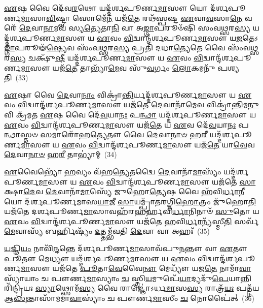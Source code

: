 {\anuvakamend[{\-\ul{𑌚}\-𑌨𑍍𑌦𑍍𑌰\-\ul{𑌮𑌾} 𑌦𑍍𑌵𑍇 𑌦𑍇᳴𑌵\-\ul{𑌲𑍋}\-𑌕\-\ul{𑌮𑍇}\-𑌵 𑌯\-\ul{𑌦𑍍𑌯}\-𑌜𑍍𑌞𑌂 𑌪᳴𑌲𑍍𑌪𑍂𑌲𑌯𑍇\-\ul{𑌯𑍁𑌃} 𑌷𑌟𑍍𑌚᳴}]}%

\-\ul{𑌏}\-𑌷 𑌵𑍈 𑌦𑍇᳴𑌵\-\ul{𑌰}\-𑌥𑍋 𑌯𑌦𑍍𑌦᳴𑌰𑍍\mbox{}𑌶𑌪𑍂𑌰𑍍𑌣\-\ul{𑌮𑌾}\-𑌸𑍗 𑌯𑍋 𑌦᳴𑌰𑍍\mbox{}𑌶𑌪𑍂𑌰𑍍𑌣\-\ul{𑌮𑌾}\-𑌸𑌾\-\ul{𑌵𑌿}\-𑌷𑍍𑌟𑍍𑌵𑌾 𑌸𑍋𑌮𑍇᳴\-\ul{𑌨} 𑌯𑌜᳴\-\ul{𑌤𑍇} 𑌰𑌥᳴𑌸𑍍𑌪𑌷𑍍𑌟 \ul{𑌏}\-𑌵𑌾\-\ul{𑌵}\-𑌸𑌾\-\ul{𑌨𑍇} 𑌵𑌰𑍇᳴ \ul{𑌦𑍇}\-𑌵𑌾\-\ul{𑌨𑌾}\-𑌮𑌵᳴ 𑌸𑍍𑌯\-\ul{𑌤𑍍𑌯𑍇}\-𑌤𑌾\-\ul{𑌨𑌿} 𑌵𑌾 𑌅\-\ul{𑌙𑍍𑌗𑌾}\-𑌪𑌰𑍂𑍞᳴𑌷𑌿 𑌸𑌂𑌵\-\ul{𑌥𑍍𑌸}\-𑌰\-\ul{𑌸𑍍𑌯} 𑌯𑌦𑍍𑌦᳴𑌰𑍍\mbox{}𑌶𑌪𑍂𑌰𑍍𑌣\-\ul{𑌮𑌾}\-𑌸𑍗 𑌯 \ul{𑌏}\-𑌵𑌂 \ul{𑌵𑌿}\-𑌦𑍍𑌵𑌾𑌨𑍍𑌦᳴𑌰𑍍\mbox{}𑌶𑌪𑍂𑌰𑍍𑌣\-\ul{𑌮𑌾}\-𑌸𑍗 𑌯\-\ul{𑌜}\-𑌤𑍇\-𑌽\-\ul{𑌙𑍍𑌗𑌾}\-𑌪𑌰𑍂𑍟᳴\-\ul{𑌷𑍍𑌯𑍇}\-𑌵 𑌸𑌂᳴𑌵\-\ul{𑌥𑍍𑌸}\-𑌰\-\ul{𑌸𑍍𑌯} 𑌪𑍍𑌰𑌤𑌿᳴ 𑌦𑌧𑌾\-\ul{𑌤𑍍𑌯𑍇}\-𑌤𑍇 𑌵𑍈 𑌸𑌂᳴𑌵\-\ul{𑌥𑍍𑌸}\-𑌰\-\ul{𑌸𑍍𑌯} 𑌚𑌕𑍍𑌷𑍁᳴\-\ul{𑌷𑍀} 𑌯𑌦𑍍𑌦᳴𑌰𑍍\mbox{}𑌶𑌪𑍂𑌰𑍍𑌣\-\ul{𑌮𑌾}\-𑌸𑍗 𑌯 \ul{𑌏}\-𑌵𑌂 \ul{𑌵𑌿}\-𑌦𑍍𑌵𑌾𑌨𑍍𑌦᳴𑌰𑍍\mbox{}𑌶𑌪𑍂𑌰𑍍𑌣\-\ul{𑌮𑌾}\-𑌸𑍗 𑌯𑌜᳴\-\ul{𑌤𑍇} 𑌤𑌾𑌭𑍍𑌯𑌾᳴\-\ul{𑌮𑍇}\-𑌵 𑌸𑍁᳴\-\ul{𑌵}\-𑌰𑍍𑌗𑌂 \ul{𑌲𑍋}\-𑌕𑌮𑌨𑍁᳴ 𑌪𑌶𑍍𑌯𑌤𑌿~(33)

\-\ul{𑌏}\-𑌷𑌾 𑌵𑍈 \ul{𑌦𑍇}\-𑌵𑌾\-\ul{𑌨𑌾𑌂} 𑌵𑌿𑌕𑍍𑌰𑌾॑\-\ul{𑌨𑍍𑌤𑌿}\-𑌰𑍍𑌯𑌦𑍍𑌦᳴𑌰𑍍\mbox{}𑌶𑌪𑍂𑌰𑍍𑌣\-\ul{𑌮𑌾}\-𑌸𑍗 𑌯 \ul{𑌏}\-𑌵𑌂 \ul{𑌵𑌿}\-𑌦𑍍𑌵𑌾𑌨𑍍𑌦᳴𑌰𑍍\mbox{}𑌶𑌪𑍂𑌰𑍍𑌣\-\ul{𑌮𑌾}\-𑌸𑍗 𑌯𑌜᳴𑌤𑍇 \ul{𑌦𑍇}\-𑌵𑌾𑌨𑌾᳴\-\ul{𑌮𑍇}\-𑌵 𑌵𑌿𑌕𑍍𑌰𑌾॑\-\ul{𑌨𑍍𑌤𑌿}\-𑌮\-\ul{𑌨𑍁} 𑌵𑌿 𑌕𑍍𑌰᳴𑌮𑌤 \ul{𑌏}\-𑌷 𑌵𑍈 𑌦𑍇᳴\-\ul{𑌵}\-𑌯𑌾\-\ul{𑌨𑌃} 𑌪\-\ul{𑌨𑍍𑌥𑌾} 𑌯𑌦𑍍𑌦᳴𑌰𑍍\mbox{}𑌶𑌪𑍂𑌰𑍍𑌣\-\ul{𑌮𑌾}\-𑌸𑍗 𑌯 \ul{𑌏}\-𑌵𑌂 \ul{𑌵𑌿}\-𑌦𑍍𑌵𑌾𑌨𑍍𑌦᳴𑌰𑍍\mbox{}𑌶𑌪𑍂𑌰𑍍𑌣\-\ul{𑌮𑌾}\-𑌸𑍗 𑌯𑌜᳴\-\ul{𑌤𑍇} 𑌯 \ul{𑌏}\-𑌵 𑌦𑍇᳴\-\ul{𑌵}\-𑌯𑌾\-\ul{𑌨𑌃} 𑌪\-\ul{𑌨𑍍𑌥𑌾}\-𑌸𑍍𑌤𑍞 \ul{𑌸}\-𑌮𑌾𑌰𑍋᳴𑌹\-\ul{𑌤𑍍𑌯𑍇}\-𑌤𑍗 𑌵𑍈 \ul{𑌦𑍇}\-𑌵𑌾\-\ul{𑌨𑌾}\-\-\ul{𑍞} 𑌹\-\ul{𑌰𑍀} 𑌯𑌦𑍍𑌦᳴𑌰𑍍\mbox{}𑌶𑌪𑍂𑌰𑍍𑌣\-\ul{𑌮𑌾}\-𑌸𑍗 𑌯 \ul{𑌏}\-𑌵𑌂 \ul{𑌵𑌿}\-𑌦𑍍𑌵𑌾𑌨𑍍𑌦᳴𑌰𑍍\mbox{}𑌶𑌪𑍂𑌰𑍍𑌣\-\ul{𑌮𑌾}\-𑌸𑍗 𑌯𑌜᳴\-\ul{𑌤𑍇} 𑌯𑌾\-\ul{𑌵𑍇}\-𑌵 \ul{𑌦𑍇}\-𑌵𑌾\-\ul{𑌨𑌾}\-\-\ul{𑍞} 𑌹\-\ul{𑌰𑍀} 𑌤𑌾𑌭𑍍𑌯𑌾॑𑌮𑍍~(34)

\-\ul{𑌏}\-𑌵𑍈𑌭𑍍𑌯𑍋᳴ \ul{𑌹}\-𑌵𑍍𑌯𑌂 𑌵᳴𑌹\-\ul{𑌤𑍍𑌯𑍇}\-𑌤𑌦𑍍𑌵𑍈 \ul{𑌦𑍇}\-𑌵𑌾𑌨𑌾᳴\-\ul{𑌮𑌾}\-𑌸𑍍𑌯𑌂᳴ 𑌯𑌦𑍍𑌦᳴𑌰𑍍\mbox{}𑌶𑌪𑍂𑌰𑍍𑌣\-\ul{𑌮𑌾}\-𑌸𑍗 𑌯 \ul{𑌏}\-𑌵𑌂 \ul{𑌵𑌿}\-𑌦𑍍𑌵𑌾𑌨𑍍𑌦᳴𑌰𑍍\mbox{}𑌶𑌪𑍂𑌰𑍍𑌣\-\ul{𑌮𑌾}\-𑌸𑍗 𑌯𑌜᳴𑌤𑍇 \ul{𑌸𑌾}\-𑌕𑍍𑌷𑌾\-\ul{𑌦𑍇}\-𑌵 \ul{𑌦𑍇}\-𑌵𑌾𑌨𑌾᳴\-\ul{𑌮𑌾}\-𑌸𑍍𑌯𑍇᳴ 𑌜𑍁𑌹𑍋\-\ul{𑌤𑍍𑌯𑍇}\-𑌷 𑌵𑍈 𑌹᳴𑌵𑌿\-\ul{𑌰𑍍𑌧𑌾}\-𑌨𑍀 𑌯𑍋 𑌦᳴𑌰𑍍\mbox{}𑌶𑌪𑍂𑌰𑍍𑌣𑌮𑌾𑌸\-\ul{𑌯𑌾}\-𑌜𑍀 \ul{𑌸𑌾}\-𑌯𑌮𑍍𑌪𑍍𑌰𑌾᳴𑌤𑌰𑌗𑍍𑌨𑌿\-\ul{𑌹𑍋}\-𑌤𑍍𑌰𑌂 𑌜𑍁᳴𑌹𑍋\-\ul{𑌤𑌿} 𑌯𑌜᳴𑌤𑍇 𑌦𑌰𑍍\mbox{}𑌶𑌪𑍂𑌰𑍍𑌣\-\ul{𑌮𑌾}\-𑌸𑌾𑌵𑌹᳴𑌰𑌹𑌰𑍍\mbox{}𑌹𑌵𑌿\-\ul{𑌰𑍍𑌧𑌾}\-𑌨𑌿𑌨𑌾𑍞᳴ \ul{𑌸𑍁}\-𑌤𑍋 𑌯 \ul{𑌏}\-𑌵𑌂 \ul{𑌵𑌿}\-𑌦𑍍𑌵𑌾𑌨𑍍𑌦᳴𑌰𑍍\mbox{}𑌶𑌪𑍂𑌰𑍍𑌣\-\ul{𑌮𑌾}\-𑌸𑍗 𑌯𑌜᳴𑌤𑍇 𑌹𑌵𑌿\-\ul{𑌰𑍍𑌧𑌾}\-𑌨𑍍𑌯᳴𑌸𑍍𑌮𑍀\-\ul{𑌤𑌿} 𑌸𑌰𑍍𑌵᳴\-\ul{𑌮𑍇}\-𑌵𑌾𑌸𑍍𑌯᳴ 𑌬𑌰𑍍\mbox{}\-\ul{𑌹𑌿}\-𑌷𑍍𑌯𑌂᳴ \ul{𑌦}\-𑌤𑍍𑌤𑌮𑍍𑌭᳴𑌵𑌤𑌿 \ul{𑌦𑍇}\-𑌵𑌾 𑌵𑌾 𑌅𑌹𑌃᳴~(35)

\-\ul{𑌯}\-𑌜𑍍𑌞𑌿\-\ul{𑌯𑌂} 𑌨𑌾𑌵𑌿᳴\-\ul{𑌨𑍍𑌦}\-𑌨𑍍𑌤𑍇 𑌦᳴𑌰𑍍\mbox{}𑌶𑌪𑍂𑌰𑍍𑌣\-\ul{𑌮𑌾}\-𑌸𑌾𑌵᳴𑌪𑍁\-\ul{𑌨}\-𑌨𑍍𑌤𑍗 𑌵𑌾 \ul{𑌏}\-𑌤𑍗 \ul{𑌪𑍂}\-𑌤𑍗 𑌮𑍇\-\ul{𑌧𑍍𑌯𑍗} 𑌯𑌦𑍍𑌦᳴𑌰𑍍\mbox{}𑌶𑌪𑍂𑌰𑍍𑌣\-\ul{𑌮𑌾}\-𑌸𑍗 𑌯 \ul{𑌏}\-𑌵𑌂 \ul{𑌵𑌿}\-𑌦𑍍𑌵𑌾𑌨𑍍𑌦᳴𑌰𑍍\mbox{}𑌶𑌪𑍂𑌰𑍍𑌣\-\ul{𑌮𑌾}\-𑌸𑍗 𑌯𑌜᳴𑌤𑍇 \ul{𑌪𑍂}\-𑌤𑌾\-\ul{𑌵𑍇}\-𑌵𑍈\-\ul{𑌨𑍗} 𑌮𑍇𑌧𑍍𑌯𑍗᳴ 𑌯𑌜\-\ul{𑌤𑍇} 𑌨𑌾𑌮𑌾᳴\-\ul{𑌵𑌾}\-𑌸𑍍𑌯𑌾᳴𑌯𑌾𑌂 𑌚 𑌪𑍗𑌰𑍍𑌣\-\ul{𑌮𑌾}\-𑌸𑍍𑌯𑌾𑌂 \ul{𑌚} 𑌸𑍍𑌤𑍍𑌰𑌿\-\ul{𑌯}\-𑌮𑍁𑌪𑍇᳴\-\ul{𑌯𑌾}\-𑌦𑍍𑌯𑌦𑍁᳴\-\ul{𑌪𑍇}\-𑌯𑌾𑌨𑍍𑌨𑌿𑌰𑌿᳴𑌨𑍍𑌦𑍍𑌰𑌿𑌯𑌃 \ul{𑌸𑍍𑌯𑌾}\-𑌥𑍍𑌸𑍋𑌮᳴\-\ul{𑌸𑍍𑌯} 𑌵𑍈 𑌰𑌾𑌜𑍍𑌞𑍋॑\-𑌽𑌰𑍍𑌧\-\ul{𑌮𑌾}\-𑌸\-\ul{𑌸𑍍𑌯} 𑌰𑌾𑌤𑍍𑌰᳴\-\ul{𑌯𑌃} 𑌪𑌤𑍍𑌨᳴𑌯 𑌆\-\ul{𑌸}\-𑌨𑍍𑌤𑌾𑌸𑌾᳴𑌮𑌮𑌾\-\ul{𑌵𑌾}\-𑌸𑍍𑌯𑌾𑌂॑ 𑌚 𑌪𑍗𑌰𑍍𑌣\-\ul{𑌮𑌾}\-𑌸𑍀𑌂 \ul{𑌚} 𑌨𑍋𑌪𑍈॑𑌤𑍍~(36)

